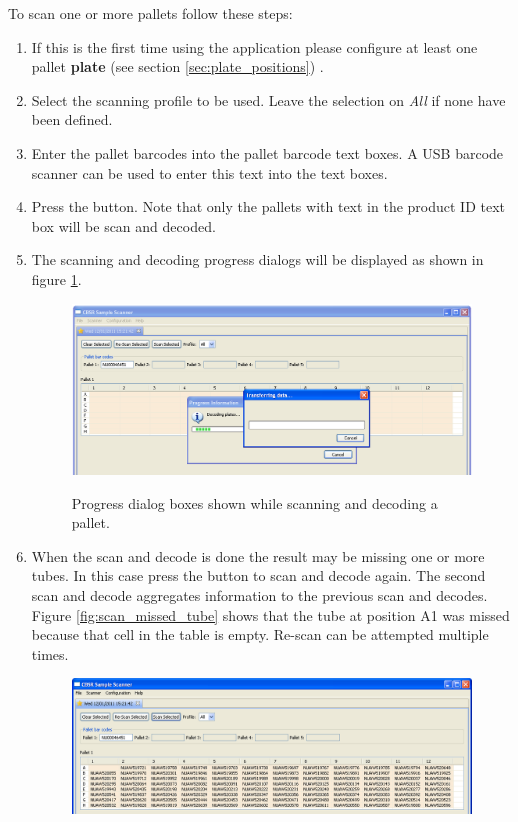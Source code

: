To scan one or more pallets follow these steps:
\begin{enumerate}
\item If this is the first time using the application please configure at least
  one pallet \textbf{plate} (see section \ref{sec:plate_positions}) .
\item Select the scanning profile to be used. Leave the selection on \emph{All}
  if none have been defined.
\item Enter the pallet barcodes into the pallet barcode text boxes. A USB
  barcode scanner can be used to enter this text into the text boxes.
\item Press the  button. Note that only the pallets with
  text in the product ID text box will be scan and decoded.
\item The scanning and decoding progress dialogs will be displayed as shown in
  figure \ref{fig:progress_dialogs}.
\begin{figure}[H]
  \centering
  \scalebox{0.35}
	   { \includegraphics*{screenshots/scan_and_decode/progress_dialogs} }
	   \caption{Progress dialog boxes shown while scanning and decoding a pallet.}
	   \label{fig:progress_dialogs}
\end{figure}
\item When the scan and decode is done the result may be missing one or more
  tubes. In this case press the  button to scan and
  decode again. The second scan and decode aggregates information to the
  previous scan and decodes. Figure \ref{fig:scan_missed_tube} shows that the
  tube at position A1 was missed because that cell in the table is
  empty. Re-scan can be attempted multiple times.
\begin{figure}[H]
  \centering
  \scalebox{0.35}
	   { \includegraphics*{screenshots/scan_and_decode/scan_missed_tube} }

\end{figure}
\end{enumerate}
